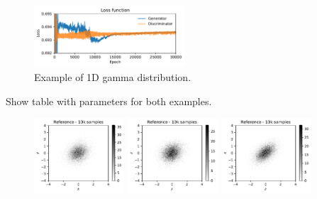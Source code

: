 \documentclass[twocolumn,preprintnumbers,superscriptaddress]{revtex4-2}
\begin{document}
\begin{figure}
  \includegraphics[width=0.5\textwidth]{plots/1Dgamma/1Dgamma_loss.pdf}
  \caption{Example of 1D gamma distribution.}
\end{figure}

Show table with parameters for both examples.

\begin{figure}
  \includegraphics[width=0.3\textwidth]{plots/3Dgaussian_posdef/1-2_REAL_10k.pdf}%
  \includegraphics[width=0.3\textwidth]{plots/3Dgaussian_posdef/2-3_REAL_10k.pdf}%
  \includegraphics[width=0.3\textwidth]{plots/3Dgaussian_posdef/3-1_REAL_10k.pdf}


\end{figure}
\end{document}
